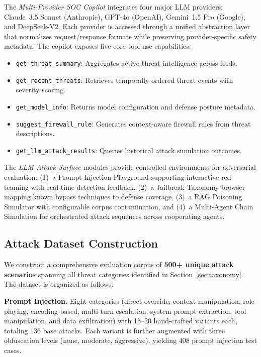 \documentclass[journal,twoside]{IEEEtran}
\begin{document}
The \emph{Multi-Provider SOC Copilot} integrates four major LLM providers: Claude~3.5 Sonnet (Anthropic), GPT-4o (OpenAI), Gemini~1.5 Pro (Google), and DeepSeek-V2. Each provider is accessed through a unified abstraction layer that normalizes request/response formats while preserving provider-specific safety metadata. The copilot exposes five core tool-use capabilities:
\begin{itemize}
    \item \texttt{get\_threat\_summary}: Aggregates active threat intelligence across feeds.
    \item \texttt{get\_recent\_threats}: Retrieves temporally ordered threat events with severity scoring.
    \item \texttt{get\_model\_info}: Returns model configuration and defense posture metadata.
    \item \texttt{suggest\_firewall\_rule}: Generates context-aware firewall rules from threat descriptions.
    \item \texttt{get\_llm\_attack\_results}: Queries historical attack simulation outcomes.
\end{itemize}

The \emph{LLM Attack Surface} modules provide controlled environments for adversarial evaluation: (1)~a Prompt Injection Playground supporting interactive red-teaming with real-time detection feedback, (2)~a Jailbreak Taxonomy browser mapping known bypass techniques to defense coverage, (3)~a RAG Poisoning Simulator with configurable corpus contamination, and (4)~a Multi-Agent Chain Simulation for orchestrated attack sequences across cooperating agents.

\subsection{Attack Dataset Construction}

We construct a comprehensive evaluation corpus of \textbf{500+ unique attack scenarios} spanning all threat categories identified in Section~\ref{sec:taxonomy}. The dataset is organized as follows:

\textbf{Prompt Injection.} Eight categories (direct override, context manipulation, role-playing, encoding-based, multi-turn escalation, system prompt extraction, tool manipulation, and data exfiltration) with 15--20 hand-crafted variants each, totaling 136 base attacks. Each variant is further augmented with three obfuscation levels (none, moderate, aggressive), yielding 408 prompt injection test cases.
\end{document}
